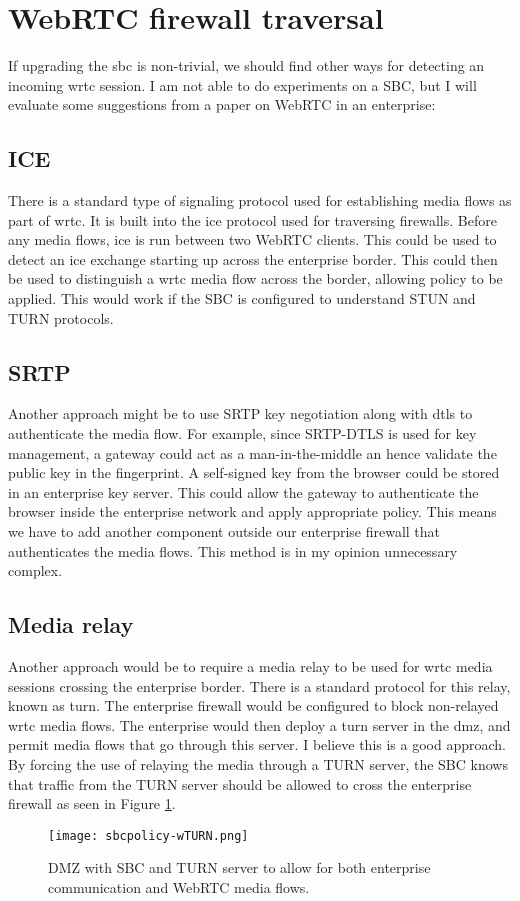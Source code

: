 \section{WebRTC firewall traversal}
If upgrading the \gls{sbc} is non-trivial, we should find other ways for detecting an incoming \gls{wrtc} session. I am not able to do experiments on a SBC, but I will evaluate some suggestions from a paper on WebRTC in an enterprise\cite{johnston_taking_2013}:

\subsection{ICE}
There is a standard type of signaling protocol used for establishing media flows as part of \gls{wrtc}. It is built into the \gls{ice} protocol used for traversing firewalls. Before any media flows, \gls{ice} is run between two WebRTC clients. This could be used to detect an \gls{ice} exchange starting up across the enterprise border. This could then be used to distinguish a \gls{wrtc} media flow across the border, allowing policy to be applied\cite{johnston_taking_2013}. This would work if the SBC is configured to understand STUN and TURN protocols.

\subsection{SRTP}
Another approach might be to use SRTP key negotiation along with \gls{dtls} to authenticate the media flow. For example, since SRTP-DTLS is used for key management, a gateway could act as a man-in-the-middle an hence validate the public key in the fingerprint. A self-signed key from the browser could be stored in an enterprise key server. This could allow the gateway to authenticate the browser inside the enterprise network and apply appropriate policy\cite{johnston_taking_2013}. This means we have to add another component outside our enterprise firewall that authenticates the media flows. This method is in my opinion unnecessary complex.

\subsection{Media relay}
Another approach would be to require a media relay to be used for \gls{wrtc} media sessions crossing the enterprise border. There is a standard protocol for this relay, known as \gls{turn}. The enterprise firewall would be configured to block non-relayed \gls{wrtc} media flows. The enterprise would then deploy a \gls{turn} server in the \gls{dmz}, and permit media flows that go through this server\cite{johnston_taking_2013}. I believe this is a good approach. By forcing the use of relaying the media through a TURN server, the SBC knows that traffic from the TURN server should be allowed to cross the enterprise firewall as seen in Figure \ref{fig:sbc-turn}.
\\
\begin{figure}[here]
\centerline{\texttt{[image: sbcpolicy-wTURN.png]}}
\caption{DMZ with SBC and TURN server to allow for both enterprise communication and WebRTC media flows.}
\label{fig:sbc-turn}
\end{figure}

